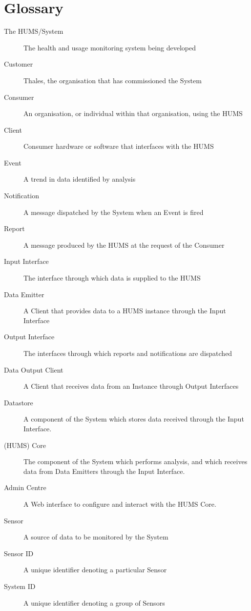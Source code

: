 \documentclass[10pt,a4paper]{article}
\begin{document}
\section{Glossary}
\label{sec:glossary}
\begin{description}%
	\item[The HUMS/System] The health and usage monitoring system being developed
	
	\vspace{0.15cm}
	\item[Customer] Thales, the organisation that has commissioned the System
	\item[Consumer] An organisation, or individual within that organisation, using the HUMS
	\item[Client] Consumer hardware or software that interfaces with the HUMS
	
	\vspace{0.15cm}
	\item[Event] A trend in data identified by analysis
	\item[Notification] A message dispatched by the System when an Event is fired
	\item[Report] A message produced by the HUMS at the request of the Consumer
	
	\vspace{0.15cm}
	\item[Input Interface] The interface through which data is supplied to  the HUMS
	\item[Data Emitter] A Client that provides data to a HUMS instance through the Input Interface
	\item[Output Interface] The interfaces through which reports and notifications are dispatched
	\item[Data Output Client] A Client that receives data from an Instance through Output Interfaces
    \item[Datastore] A component of the System which stores data received through the Input Interface.
    \item[(HUMS) Core] The component of the System which performs analysis, and which receives data from Data Emitters through the Input Interface.
	\item[Admin Centre] A Web interface to configure and interact with the HUMS Core.

	\vspace{0.14cm}
	\item[Sensor] A source of data to be monitored by the System
	\item[Sensor ID] A unique identifier denoting a particular Sensor
	\item[System ID] A unique identifier denoting a group of Sensors
\end{description}
\end{document}
